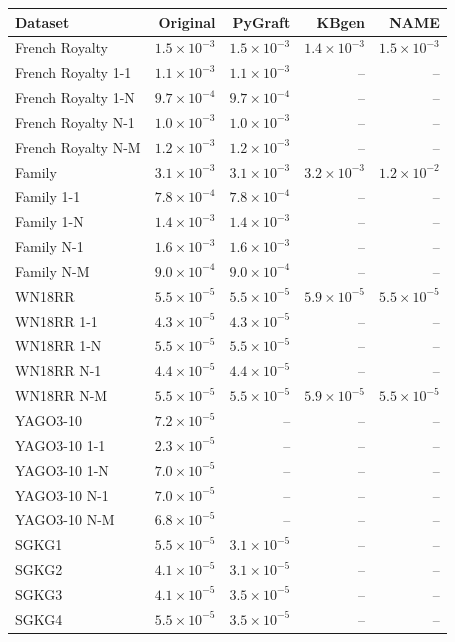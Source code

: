 \begin{tabular}{lrrrr}
\toprule
Dataset & Original & PyGraft & KBgen & NAME \\
\midrule
French Royalty & $1.5\times10^{-3}$ & $1.5\times10^{-3}$ & $1.4\times10^{-3}$ & $1.5\times10^{-3}$ \\
French Royalty 1-1 & $1.1\times10^{-3}$ & $1.1\times10^{-3}$ & – & – \\
French Royalty 1-N & $9.7\times10^{-4}$ & $9.7\times10^{-4}$ & – & – \\
French Royalty N-1 & $1.0\times10^{-3}$ & $1.0\times10^{-3}$ & – & – \\
French Royalty N-M & $1.2\times10^{-3}$ & $1.2\times10^{-3}$ & – & – \\
\midrule
Family & $3.1\times10^{-3}$ & $3.1\times10^{-3}$ & $3.2\times10^{-3}$ & $1.2\times10^{-2}$ \\
Family 1-1 & $7.8\times10^{-4}$ & $7.8\times10^{-4}$ & – & – \\
Family 1-N & $1.4\times10^{-3}$ & $1.4\times10^{-3}$ & – & – \\
Family N-1 & $1.6\times10^{-3}$ & $1.6\times10^{-3}$ & – & – \\
Family N-M & $9.0\times10^{-4}$ & $9.0\times10^{-4}$ & – & – \\
\midrule
WN18RR & $5.5\times10^{-5}$ & $5.5\times10^{-5}$ & $5.9\times10^{-5}$ & $5.5\times10^{-5}$ \\
WN18RR 1-1 & $4.3\times10^{-5}$ & $4.3\times10^{-5}$ & – & – \\
WN18RR 1-N & $5.5\times10^{-5}$ & $5.5\times10^{-5}$ & – & – \\
WN18RR N-1 & $4.4\times10^{-5}$ & $4.4\times10^{-5}$ & – & – \\
WN18RR N-M & $5.5\times10^{-5}$ & $5.5\times10^{-5}$ & $5.9\times10^{-5}$ & $5.5\times10^{-5}$ \\
\midrule
YAGO3-10 & $7.2\times10^{-5}$ & – & – & – \\
YAGO3-10 1-1 & $2.3\times10^{-5}$ & – & – & – \\
YAGO3-10 1-N & $7.0\times10^{-5}$ & – & – & – \\
YAGO3-10 N-1 & $7.0\times10^{-5}$ & – & – & – \\
YAGO3-10 N-M & $6.8\times10^{-5}$ & – & – & – \\
\midrule
SGKG1 & $5.5\times10^{-5}$ & $3.1\times10^{-5}$ & – & – \\
SGKG2 & $4.1\times10^{-5}$ & $3.1\times10^{-5}$ & – & – \\
SGKG3 & $4.1\times10^{-5}$ & $3.5\times10^{-5}$ & – & – \\
SGKG4 & $5.5\times10^{-5}$ & $3.5\times10^{-5}$ & – & – \\
\bottomrule
\end{tabular}
